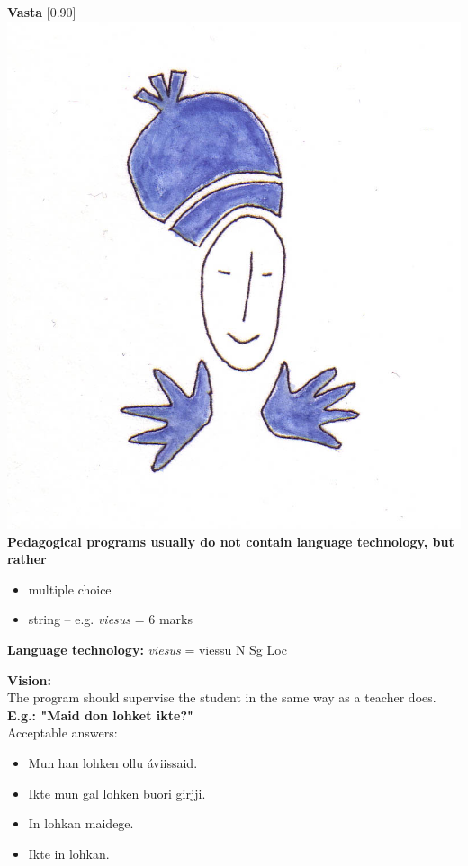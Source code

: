 \documentclass[landscape,norsk,11pt]{seminar}
\begin{document}
\begin{slide}
\newslide
\textbf{Vasta}
\scalebox{0.90}[0.90]{\includegraphics{img/vasta.png}} \\


\newslide
\textbf{Pedagogical programs usually do not contain language technology, but rather} 
\begin{itemize}
\item multiple choice 
\item string -- e.g. \textit{viesus} = 6 marks 
\end{itemize}

\textbf{Language technology:} \textit{viesus} = viessu N Sg Loc 


\newslide
\textbf{Vision:}\\
The program should supervise the student in the same way as a teacher does.
\newslide
\textbf{E.g.: "Maid don lohket ikte?"} \\
Acceptable answers:
\begin{itemize}
\item Mun han lohken ollu áviissaid. 
\item Ikte mun gal lohken buori girjji. 
\item In lohkan maidege. 
\item Ikte in lohkan.
\end{itemize}


\end{slide}
\end{document}
